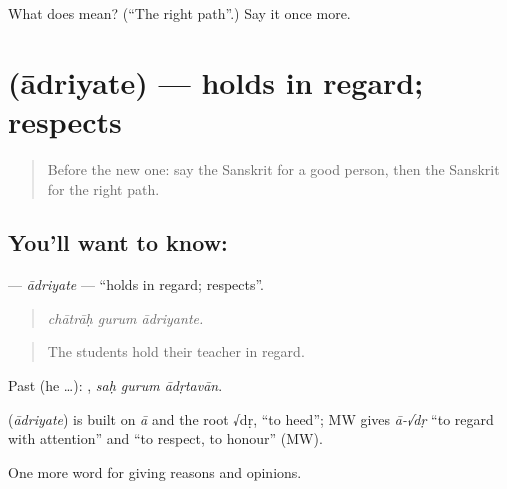 \begin{tcolorbox}[breakable,colback=teal!4,colframe=teal!35!black,title={Before you move on}]
What does  mean? (\textquotedblleft{}The right path\textquotedblright{}.) Say it once more.
\end{tcolorbox}
\section[\texorpdfstring{\sk{आद्रियते} (ādriyate)}{आद्रियते (ādriyate)}]{ (ādriyate) — holds in regard; respects}

\label{lesson:SA-C358-adriyate}



\begin{quote}
Before the new one: say the Sanskrit for a good person, then the Sanskrit for the right path.
\end{quote}

\subsection*{You'll want to know: }
\textbf{} — \emph{ādriyate} — \textquotedblleft{}holds in regard; respects\textquotedblright{}.

\begin{quote}
  
\end{quote}

\begin{quote}
\emph{chātrāḥ gurum ādriyante.}
\end{quote}

\begin{quote}
The students hold their teacher in regard.
\end{quote}

Past (he …):   , \emph{saḥ gurum ādṛtavān}.

\begin{cousinweb}
\textbf{} (\emph{ādriyate}) is built on \emph{ā} and the root √dṛ, \textquotedblleft{}to heed\textquotedblright{}; MW gives \emph{ā-√dṛ} \textquotedblleft{}to regard with attention\textquotedblright{} and \textquotedblleft{}to respect, to honour\textquotedblright{} (MW).
\end{cousinweb}

\begin{grammarlens}[title={What you've built}]
One more word for giving reasons and opinions.
\end{grammarlens}

